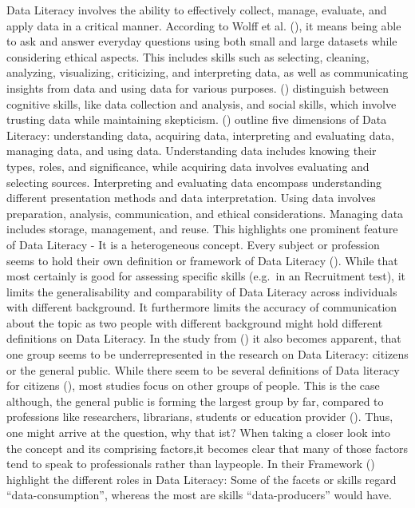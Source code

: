 \documentclass[
  12pt,
  a4paper,
  twoside]{article}
\begin{document}
Data Literacy involves the ability to effectively collect, manage, evaluate, and apply data in a critical manner. According to Wolff et al. (), it means being able to ask and answer everyday questions using both small and large datasets while considering ethical aspects. This includes skills such as selecting, cleaning, analyzing, visualizing, criticizing, and interpreting data, as well as communicating insights from data and using data for various purposes. () distinguish between cognitive skills, like data collection and analysis, and social skills, which involve trusting data while maintaining skepticism. () outline five dimensions of Data Literacy: understanding data, acquiring data, interpreting and evaluating data, managing data, and using data. Understanding data includes knowing their types, roles, and significance, while acquiring data involves evaluating and selecting sources. Interpreting and evaluating data encompass understanding different presentation methods and data interpretation. Using data involves preparation, analysis, communication, and ethical considerations. Managing data includes storage, management, and reuse.
This highlights one prominent feature of Data Literacy - It is a heterogeneous concept. Every subject or profession seems to hold their own definition or framework of Data Literacy (). While that most certainly is good for assessing specific skills (e.g.~in an Recruitment test), it limits the generalisability and comparability of Data Literacy across individuals with different background. It furthermore limits the accuracy of communication about the topic as two people with different background might hold different definitions on Data Literacy. In the study from () it also becomes apparent, that one group seems to be underrepresented in the research on Data Literacy: citizens or the general public.
While there seem to be several definitions of Data literacy for citizens (), most studies focus on other groups of people. This is the case although, the general public is forming the largest group by far, compared to professions like researchers, librarians, students or education provider (). Thus, one might arrive at the question, why that ist? When taking a closer look into the concept and its comprising factors,it becomes clear that many of those factors tend to speak to professionals rather than laypeople. In their Framework () highlight the different roles in Data Literacy: Some of the facets or skills regard ``data-consumption'', whereas the most are skills ``data-producers'' would have.
\end{document}
